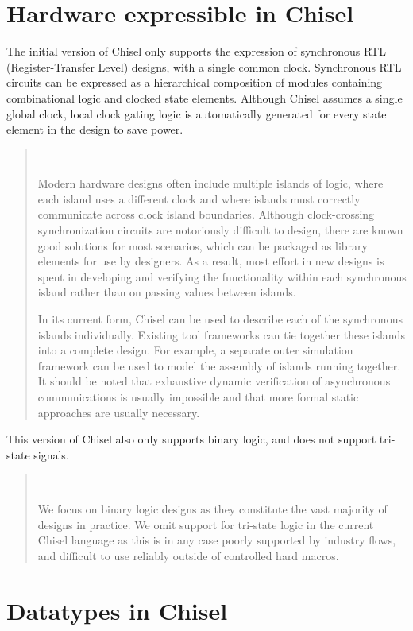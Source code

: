 \documentclass[10pt]{article}
\newenvironment{commentary}
{ \vspace{-0.1in}
  \begin{quotation}
  \noindent
  \small \em
  \rule{\linewidth}{1pt}\\
}
{
  \end{quotation}
}
\begin{document}
\section{Hardware expressible in Chisel}

The initial version of Chisel only supports the expression of
synchronous RTL (Register-Transfer Level) designs, with a single
common clock.  Synchronous RTL circuits can be expressed as a
hierarchical composition of modules containing combinational logic and
clocked state elements.  Although Chisel assumes a single global
clock, local clock gating logic is automatically generated for every
state element in the design to save power.
\begin{commentary}
Modern hardware designs often include multiple islands of logic, where
each island uses a different clock and where islands must correctly
communicate across clock island boundaries.  Although clock-crossing
synchronization circuits are notoriously difficult to design, there
are known good solutions for most scenarios, which can be packaged as
library elements for use by designers.  As a result, most effort in
new designs is spent in developing and verifying the functionality
within each synchronous island rather than on passing values between
islands.

In its current form, Chisel can be used to describe each of the
synchronous islands individually. Existing tool frameworks can tie
together these islands into a complete design.  For example, a
separate outer simulation framework can be used to model the assembly
of islands running together.  It should be noted that exhaustive
dynamic verification of asynchronous communications is usually
impossible and that more formal static approaches are usually
necessary.
\end{commentary}

This version of Chisel also only supports binary logic, and does not
support tri-state signals.
\begin{commentary}
We focus on binary logic designs as they constitute the vast majority
of designs in practice.  We omit support for tri-state logic in the
current Chisel language as this is in any case poorly supported by
industry flows, and difficult to use reliably outside of controlled
hard macros.
\end{commentary}

\section{Datatypes in Chisel}
\end{document}
